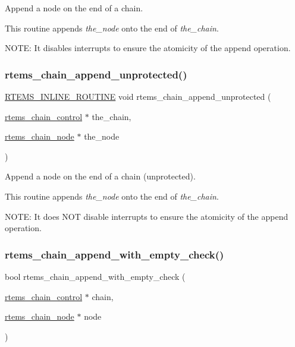 Append a node on the end of a chain. 

This routine appends {\itshape the\+\_\+node} onto the end of {\itshape the\+\_\+chain}.

N\+O\+TE\+: It disables interrupts to ensure the atomicity of the append operation. \mbox{\label{group__ClassicChains_ga8f97f792051585d8bd91d0ca0d302f96}} 
\subsubsection{\texorpdfstring{rtems\_chain\_append\_unprotected()}{rtems\_chain\_append\_unprotected()}}
{\footnotesize\ttfamily \mbox{\hyperlink{group__RTEMSScoreBaseDefs_gac216239df231d5dbd15e3520b0b9313f}{R\+T\+E\+M\+S\+\_\+\+I\+N\+L\+I\+N\+E\+\_\+\+R\+O\+U\+T\+I\+NE}} void rtems\+\_\+chain\+\_\+append\+\_\+unprotected (\begin{DoxyParamCaption}\item[{\mbox{\hyperlink{unionChain__Control}{rtems\+\_\+chain\+\_\+control}} $\ast$}]{the\+\_\+chain,  }\item[{\mbox{\hyperlink{structChain__Node__struct}{rtems\+\_\+chain\+\_\+node}} $\ast$}]{the\+\_\+node }\end{DoxyParamCaption})}



Append a node on the end of a chain (unprotected). 

This routine appends {\itshape the\+\_\+node} onto the end of {\itshape the\+\_\+chain}.

N\+O\+TE\+: It does N\+OT disable interrupts to ensure the atomicity of the append operation. \mbox{\label{group__ClassicChains_ga18e97328c682a96fbbc983cf624a033b}} 
\subsubsection{\texorpdfstring{rtems\_chain\_append\_with\_empty\_check()}{rtems\_chain\_append\_with\_empty\_check()}}
{\footnotesize\ttfamily bool rtems\+\_\+chain\+\_\+append\+\_\+with\+\_\+empty\+\_\+check (\begin{DoxyParamCaption}\item[{\mbox{\hyperlink{unionChain__Control}{rtems\+\_\+chain\+\_\+control}} $\ast$}]{chain,  }\item[{\mbox{\hyperlink{structChain__Node__struct}{rtems\+\_\+chain\+\_\+node}} $\ast$}]{node }\end{DoxyParamCaption})}



